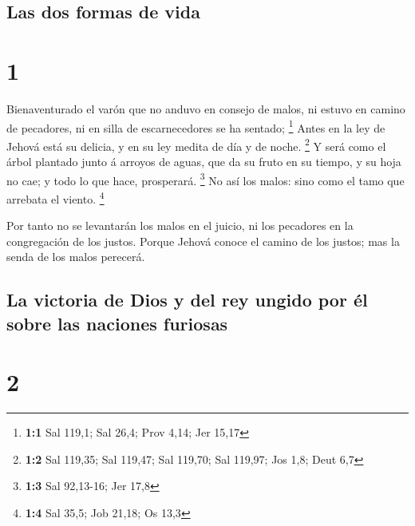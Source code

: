 \hypertarget{las-dos-formas-de-vida}{%
\subsection{Las dos formas de vida}\label{las-dos-formas-de-vida}}

\hypertarget{section}{%
\section{1}\label{section}}

 Bienaventurado el varón que no anduvo en consejo de malos,
ni estuvo en camino de pecadores, ni en silla de escarnecedores se ha
sentado; \footnote{\textbf{1:1} Sal 119,1; Sal 26,4; Prov 4,14; Jer
  15,17}  Antes en la ley de Jehová está su delicia, y en su
ley medita de día y de noche. \footnote{\textbf{1:2} Sal 119,35; Sal
  119,47; Sal 119,70; Sal 119,97; Jos 1,8; Deut 6,7}  Y será
como el árbol plantado junto á arroyos de aguas, que da su fruto en su
tiempo, y su hoja no cae; y todo lo que hace, prosperará. \footnote{\textbf{1:3}
  Sal 92,13-16; Jer 17,8}  No así los malos: sino como el
tamo que arrebata el viento. \footnote{\textbf{1:4} Sal 35,5; Job 21,18;
  Os 13,3}

 Por tanto no se levantarán los malos en el juicio, ni los
pecadores en la congregación de los justos.  Porque Jehová
conoce el camino de los justos; mas la senda de los malos perecerá.

\hypertarget{la-victoria-de-dios-y-del-rey-ungido-por-uxe9l-sobre-las-naciones-furiosas}{%
\subsection{La victoria de Dios y del rey ungido por él sobre las
naciones
furiosas}\label{la-victoria-de-dios-y-del-rey-ungido-por-uxe9l-sobre-las-naciones-furiosas}}

\hypertarget{section-1}{%
\section{2}\label{section-1}}

